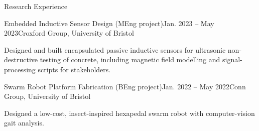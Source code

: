 \begin{rSection}{Research Experience}
    \begin{rSubsection}{Embedded Inductive Sensor Design (MEng project)}{Jan. 2023 -- May 2023}{Croxford Group, University of Bristol}{}
        \item Designed and built encapsulated passive inductive sensors for ultrasonic non-destructive testing of concrete, including magnetic field modelling and signal-processing scripts for stakeholders.
    \end{rSubsection}

    \begin{rSubsection}{Swarm Robot Platform Fabrication (BEng project)}{Jan. 2022 -- May 2022}{Conn Group, University of Bristol}{}
        \item Designed a low-cost, insect-inspired hexapedal swarm robot with computer-vision gait analysis.
    \end{rSubsection}

\end{rSection}
